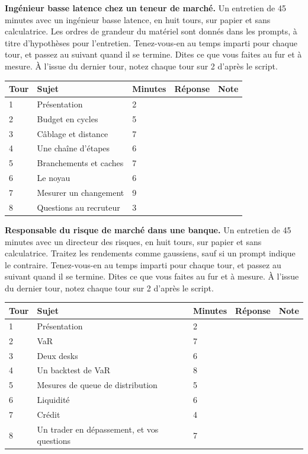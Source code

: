 \vfill\clearpage
\begin{question}\label{iq:iv2:mock-interviews:8}
\textbf{Ingénieur basse latence chez un teneur de marché.} Un entretien de 45 minutes avec un ingénieur basse latence, en huit tours, sur papier et sans calculatrice. Les ordres de grandeur du matériel sont donnés dans les prompts, à titre d'hypothèses pour l'entretien. Tenez-vous-en au temps imparti pour chaque tour, et passez au suivant quand il se termine. Dites ce que vous faites au fur et à mesure. À l'issue du dernier tour, notez chaque tour sur 2 d'après le script.

\medskip
\begin{tabular}{@{}l|l|l|l|l@{}}
Tour & Sujet & Minutes & Réponse & Note \\ \hline
1 & Présentation & 2 & & \\[6pt]\hline
2 & Budget en cycles & 5 & & \\[6pt]\hline
3 & Câblage et distance & 7 & & \\[6pt]\hline
4 & Une chaîne d'étapes & 6 & & \\[6pt]\hline
5 & Branchements et caches & 7 & & \\[6pt]\hline
6 & Le noyau & 6 & & \\[6pt]\hline
7 & Mesurer un changement & 9 & & \\[6pt]\hline
8 & Questions au recruteur & 3 & & \\[6pt]\hline
\end{tabular}
\end{question}

\vfill\clearpage
\begin{question}\label{iq:iv2:mock-interviews:9}
\textbf{Responsable du risque de marché dans une banque.} Un entretien de 45 minutes avec un directeur des risques, en huit tours, sur papier et sans calculatrice. Traitez les rendements comme gaussiens, sauf si un prompt indique le contraire. Tenez-vous-en au temps imparti pour chaque tour, et passez au suivant quand il se termine. Dites ce que vous faites au fur et à mesure. À l'issue du dernier tour, notez chaque tour sur 2 d'après le script.

\medskip
\begin{tabular}{@{}l|l|l|l|l@{}}
Tour & Sujet & Minutes & Réponse & Note \\ \hline
1 & Présentation & 2 & & \\[6pt]\hline
2 & VaR & 7 & & \\[6pt]\hline
3 & Deux desks & 6 & & \\[6pt]\hline
4 & Un backtest de VaR & 8 & & \\[6pt]\hline
5 & Mesures de queue de distribution & 5 & & \\[6pt]\hline
6 & Liquidité & 6 & & \\[6pt]\hline
7 & Crédit & 4 & & \\[6pt]\hline
8 & Un trader en dépassement, et vos questions & 7 & & \\[6pt]\hline
\end{tabular}
\end{question}

